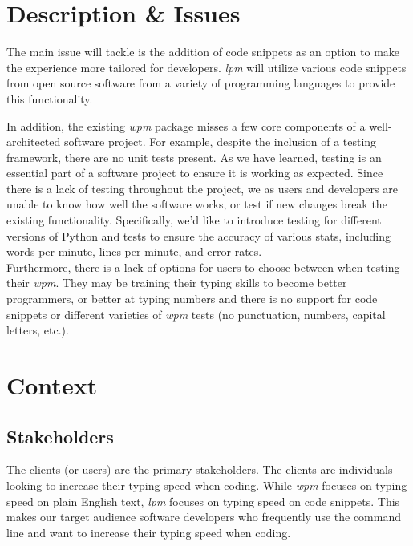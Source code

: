 \documentclass{article}
\begin{document}
\section*{Description \& Issues}

The main issue  will tackle is the addition of code snippets as an option to make the experience more tailored for developers. \textit{lpm} will utilize various code snippets from open source software from a variety of programming languages to provide this functionality.

In addition, the existing \textit{wpm} package misses a few core components of a well-architected software project. For example, despite the inclusion of a testing framework, there are no unit tests present. As we have learned, testing is an essential part of a software project to ensure it is working as expected. Since there is a lack of testing throughout the project, we as users and developers are unable to know how well the software works, or test if new changes break the existing functionality. Specifically, we'd like to introduce testing for different versions of Python and tests to ensure the accuracy of various stats, including words per minute, lines per minute, and error rates. \\

Furthermore, there is a lack of options for users to choose between when testing their \textit{wpm}. They may be training their typing skills to become better programmers, or better at typing numbers and there is no support for code snippets or different varieties of \textit{wpm} tests (no punctuation, numbers, capital letters, etc.). \\

\section*{Context}
\subsection*{Stakeholders}

The clients (or users) are the primary stakeholders. The clients are individuals looking to increase their typing speed when coding. While \textit{wpm} focuses on typing speed on plain English text, \textit{lpm} focuses on typing speed on code snippets. This makes our target audience software developers who frequently use the command line and want to increase their typing speed when coding.\\
\end{document}
